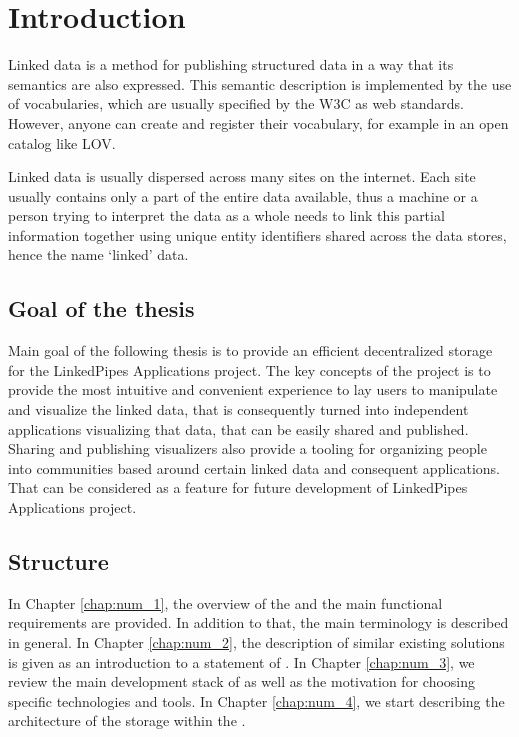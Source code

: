 \chapter*{Introduction}


Linked data is a method for publishing structured data in a way that its semantics are also expressed. This semantic description is implemented by the use of vocabularies, which are usually specified by the \acrshort{W3C} as web standards. However, anyone can create and register their vocabulary, for example in an open catalog like \acrshort{LOV}.

Linked data is usually dispersed across many sites on the internet. Each site usually contains only a part of the entire data available, thus a machine or a person trying to interpret the data as a whole needs to link this partial information together using unique entity identifiers shared across the data stores, hence the name `linked' data.


 
\section*{Goal of the thesis}
Main goal of the following thesis is to provide an efficient decentralized storage for the LinkedPipes Applications project. The key concepts of the project is to provide the most intuitive and convenient experience to lay users to manipulate and visualize the linked data, that is consequently turned into independent applications visualizing that data, that can be easily shared and published. Sharing and publishing visualizers also provide a tooling for organizing people into communities based around certain linked data and consequent applications. That can be considered as a feature for future development of LinkedPipes Applications project. 

\section*{Structure}

In Chapter \ref{chap:num_1}, the overview of the \lpa{} and the main functional requirements are provided. In addition to that, the main terminology is described in general. In Chapter \ref{chap:num_2}, the description of similar existing solutions is given as an introduction to a statement of \lpas{}. In Chapter \ref{chap:num_3}, we review the main development stack of \lpas{} as well as the motivation for choosing specific technologies and tools. In Chapter \ref{chap:num_4}, we start describing the architecture of the \lpas{} storage within the \lpa{}.